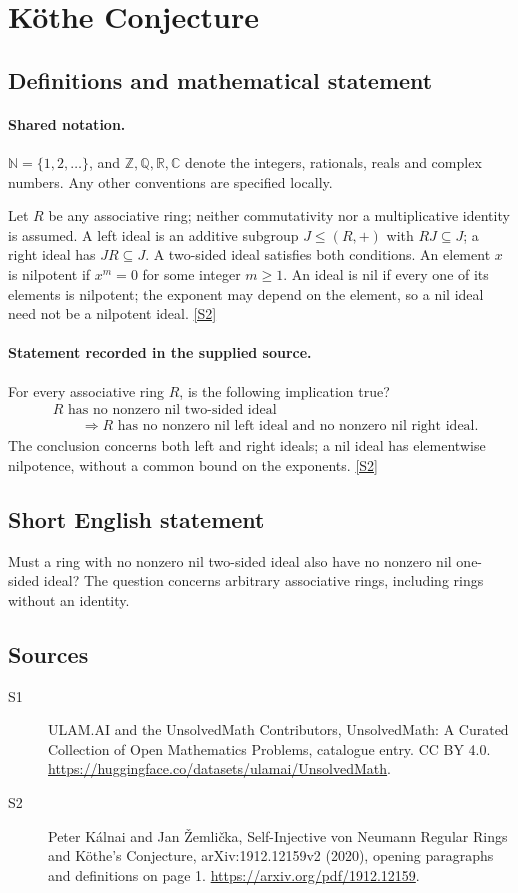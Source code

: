 \documentclass[11pt]{article}
\newcommand{\sref}[2]{\hyperlink{source:#1:#2}{[S#2]}}
\begin{document}
\section{Köthe Conjecture}\label{statement}

\subsection{Definitions and mathematical statement}

\paragraph{Shared notation.}$\mathbb N=\{1,2,\ldots\}$, and $\mathbb Z,\mathbb Q,\mathbb R,\mathbb C$ denote the integers, rationals, reals and complex numbers. Any other conventions are specified locally.


Let $R$ be any associative ring; neither commutativity nor a multiplicative identity is assumed. A left ideal is an additive subgroup $J\le(R,+)$ with $RJ\subseteq J$; a right ideal has $JR\subseteq J$. A two-sided ideal satisfies both conditions. An element $x$ is nilpotent if $x^m=0$ for some integer $m\ge1$. An ideal is nil if every one of its elements is nilpotent; the exponent may depend on the element, so a nil ideal need not be a nilpotent ideal. \sref{statement}{2}
\paragraph{Statement recorded in the supplied source.}
For every associative ring $R$, is the following implication true?
\[
 \begin{aligned}
 &R\text{ has no nonzero nil two-sided ideal}\\
 &\qquad\Longrightarrow
 R\text{ has no nonzero nil left ideal and no nonzero nil right ideal}.
 \end{aligned}
\]
The conclusion concerns both left and right ideals; a nil ideal has elementwise nilpotence, without a common bound on the exponents. \sref{statement}{2}
\subsection{Short English statement}
Must a ring with no nonzero nil two-sided ideal also have no nonzero nil one-sided ideal? The question concerns arbitrary associative rings, including rings without an identity.
\subsection{Sources}
\begin{description}
\item[\hypertarget{source:statement:1}{S1}] ULAM.AI and the UnsolvedMath Contributors, UnsolvedMath: A Curated Collection of Open Mathematics Problems, catalogue entry. CC BY 4.0. \url{https://huggingface.co/datasets/ulamai/UnsolvedMath}.
\item[\hypertarget{source:statement:2}{S2}] Peter Kálnai and Jan Žemlička, Self-Injective von Neumann Regular Rings and Köthe’s Conjecture, arXiv:1912.12159v2 (2020), opening paragraphs and definitions on page 1. \url{https://arxiv.org/pdf/1912.12159}.
\end{description}
\label{end:statement}
\end{document}

